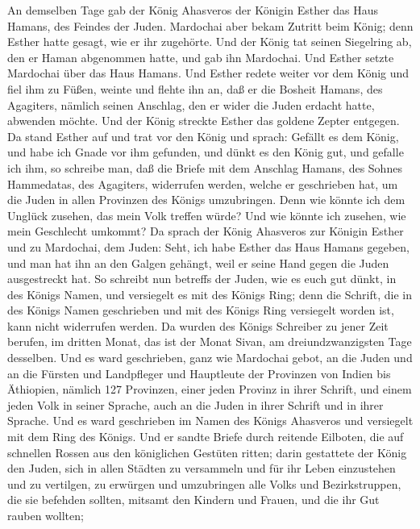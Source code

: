  An demselben Tage gab der König Ahasveros der Königin
Esther das Haus Hamans, des Feindes der Juden. Mardochai aber bekam
Zutritt beim König; denn Esther hatte gesagt, wie er ihr zugehörte.
 Und der König tat seinen Siegelring ab, den er Haman
abgenommen hatte, und gab ihn Mardochai. Und Esther setzte Mardochai
über das Haus Hamans.  Und Esther redete weiter vor dem
König und fiel ihm zu Füßen, weinte und flehte ihn an, daß er die
Bosheit Hamans, des Agagiters, nämlich seinen Anschlag, den er wider die
Juden erdacht hatte, abwenden möchte.  Und der König
streckte Esther das goldene Zepter entgegen. Da stand Esther auf und
trat vor den König und sprach:  Gefällt es dem König, und
habe ich Gnade vor ihm gefunden, und dünkt es den König gut, und gefalle
ich ihm, so schreibe man, daß die Briefe mit dem Anschlag Hamans, des
Sohnes Hammedatas, des Agagiters, widerrufen werden, welche er
geschrieben hat, um die Juden in allen Provinzen des Königs umzubringen.
 Denn wie könnte ich dem Unglück zusehen, das mein Volk
treffen würde? Und wie könnte ich zusehen, wie mein Geschlecht umkommt?
 Da sprach der König Ahasveros zur Königin Esther und zu
Mardochai, dem Juden: Seht, ich habe Esther das Haus Hamans gegeben, und
man hat ihn an den Galgen gehängt, weil er seine Hand gegen die Juden
ausgestreckt hat.  So schreibt nun betreffs der Juden, wie
es euch gut dünkt, in des Königs Namen, und versiegelt es mit des Königs
Ring; denn die Schrift, die in des Königs Namen geschrieben und mit des
Königs Ring versiegelt worden ist, kann nicht widerrufen werden.
 Da wurden des Königs Schreiber zu jener Zeit berufen, im
dritten Monat, das ist der Monat Sivan, am dreiundzwanzigsten Tage
desselben. Und es ward geschrieben, ganz wie Mardochai gebot, an die
Juden und an die Fürsten und Landpfleger und Hauptleute der Provinzen
von Indien bis Äthiopien, nämlich 127 Provinzen, einer jeden Provinz in
ihrer Schrift, und einem jeden Volk in seiner Sprache, auch an die Juden
in ihrer Schrift und in ihrer Sprache.  Und es ward
geschrieben im Namen des Königs Ahasveros und versiegelt mit dem Ring
des Königs. Und er sandte Briefe durch reitende Eilboten, die auf
schnellen Rossen aus den königlichen Gestüten ritten; 
darin gestattete der König den Juden, sich in allen Städten zu
versammeln und für ihr Leben einzustehen und zu vertilgen, zu erwürgen
und umzubringen alle Volks und Bezirkstruppen, die sie befehden sollten,
mitsamt den Kindern und Frauen, und die ihr Gut rauben wollten;
